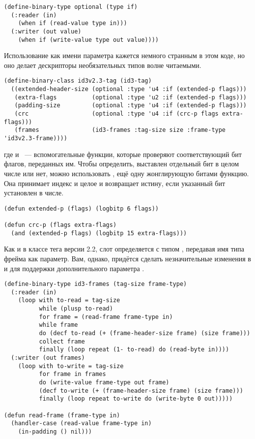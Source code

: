 \begin{lstlisting}
(define-binary-type optional (type if)
  (:reader (in)
    (when if (read-value type in)))
  (:writer (out value)
    (when if (write-value type out value))))
\end{lstlisting}

Использование  как имени параметра кажется немного странным в этом коде, но оно
делает дескрипторы необязательных типов волне читаемыми.

\begin{lstlisting}
(define-binary-class id3v2.3-tag (id3-tag)
  ((extended-header-size (optional :type 'u4 :if (extended-p flags)))
   (extra-flags          (optional :type 'u2 :if (extended-p flags)))
   (padding-size         (optional :type 'u4 :if (extended-p flags)))
   (crc                  (optional :type 'u4 :if (crc-p flags extra-flags)))
   (frames               (id3-frames :tag-size size :frame-type 'id3v2.3-frame))))
\end{lstlisting}

где  и ~--- вспомогательные функции, которые проверяют
соответствующий бит флагов, переданных им. Чтобы определить, выставлен отдельный бит в
целом числе или нет, можно использовать , ещё одну жонглирующую битами
функцию. Она принимает индекс и целое и возвращает истину, если указанный бит установлен в
числе.

\begin{lstlisting}
(defun extended-p (flags) (logbitp 6 flags))

(defun crc-p (flags extra-flags)
  (and (extended-p flags) (logbitp 15 extra-flags)))
\end{lstlisting}

Как и в классе тега версии 2.2, слот  определяется с типом ,
передавая имя типа фрейма как параметр. Вам, однако, придётся сделать незначительные
изменения в  и  для поддержки дополнительного параметра
.

\begin{lstlisting}
(define-binary-type id3-frames (tag-size frame-type)
  (:reader (in)
    (loop with to-read = tag-size
          while (plusp to-read)
          for frame = (read-frame frame-type in)
          while frame
          do (decf to-read (+ (frame-header-size frame) (size frame)))
          collect frame
          finally (loop repeat (1- to-read) do (read-byte in))))
  (:writer (out frames)
    (loop with to-write = tag-size
          for frame in frames
          do (write-value frame-type out frame)
          (decf to-write (+ (frame-header-size frame) (size frame)))
          finally (loop repeat to-write do (write-byte 0 out)))))

(defun read-frame (frame-type in)
  (handler-case (read-value frame-type in)
    (in-padding () nil)))
\end{lstlisting}

